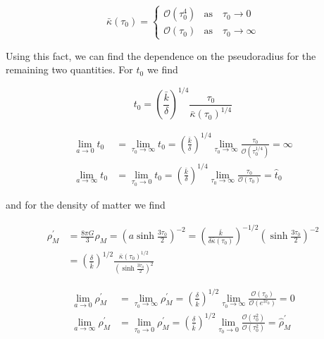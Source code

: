 \documentclass[preprint,notitlepage,amsmath,amssymb,floatfix]{revtex4-1}
\begin{document}
\begin{equation}
\bar{\kappa}\left(\tau_0\right) = 
\begin{cases}
\mathcal{O}\left(\tau_0^4\right) & \mathrm{as}\quad \tau_0\to 0 \\
\mathcal{O}\left(\tau_0\right) & \mathrm{as}\quad \tau_0\to\infty
\end{cases}
\end{equation}

\noindent Using this fact, we can find the dependence on the pseudoradius for the remaining two quantities.  For $t_0$ we find

\begin{equation}
t_0 = \left(\frac{\bar k}{\delta}\right)^{1/4}\frac{\tau_0}{\bar\kappa\left(\tau_0\right)^{1/4}}
\end{equation}

\begin{align}
\lim_{a\to 0} t_0 &= \lim_{\tau_0\to\infty} t_0 = \left(\frac{\bar k}{\delta}\right)^{1/4}\lim_{\tau_0\to\infty}\frac{\tau_0}{\mathcal{O}\left(\tau_0^{1/4}\right)} = \infty \\
\lim_{a\to\infty} t_0 &= \lim_{\tau_0\to 0} t_0 = \left(\frac{\bar k}{\delta}\right)^{1/4}\lim_{\tau_0\to\infty}\frac{\tau_0}{\mathcal{O}\left(\tau_0\right)} = \hat{t}_0
\end{align}

\noindent and for the density of matter we find

\begin{equation}
\begin{split}
\rho_M^\prime &= \frac{8\pi G}{3}\rho_M = \left(a\sinh\frac{3\tau_0}{2}\right)^{-2} = \left(\frac{\bar k}{\delta\bar\kappa\left(\tau_0\right)}\right)^{-1/2}\left(\sinh\frac{3\tau_0}{2}\right)^{-2} \\
&= \left(\frac{\delta}{\bar k}\right)^{1/2}\frac{\bar\kappa\left(\tau_0\right)^{1/2}}{\left(\sinh\frac{3\tau_0}{2}\right)^2}
\end{split}
\end{equation}

\begin{align}
\lim_{a\to 0}\rho_M^\prime &= \lim_{\tau_0\to\infty}\rho_M^\prime = \left(\frac{\delta}{\bar k}\right)^{1/2}\lim_{\tau_0\to\infty}\frac{\mathcal{O}\left(\tau_0\right)}{\mathcal{O}\left(e^{3\tau_0}\right)} = 0 \\
\lim_{a\to\infty}\rho_M^\prime &= \lim_{\tau_0\to 0}\rho_M^\prime = \left(\frac{\delta}{\bar k}\right)^{1/2}\lim_{\tau_0\to 0}\frac{\mathcal{O}\left(\tau_0^2\right)}{\mathcal{O}\left(\tau_0^2\right)} = \hat{\rho}_M^\prime
\end{align}
\end{document}
